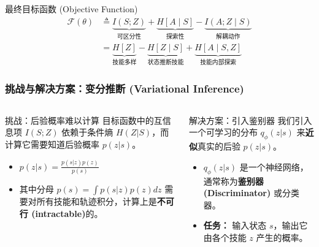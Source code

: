 \documentclass{beamer}
\begin{document}
\begin{frame}
    \begin{alertblock}{最终目标函数 (Objective Function)}
    \begin{align*}
        \mathcal{F}(\theta) 
        &\triangleq \underbrace{I(S; Z)}_{\text{可区分性}} 
                 + \underbrace{H[A \mid S]}_{\text{探索性}} 
                 - \underbrace{I(A; Z \mid S)}_{\text{解耦动作}} \\
        &= \underbrace{H[Z]}_{\text{技能多样}} 
           - \underbrace{H[Z \mid S]}_{\text{状态推断技能}} 
           + \underbrace{H[A \mid S, Z]}_{\text{技能内部探索}}
    \end{align*}
    \end{alertblock}

\end{frame}

\begin{frame}
    
    \frametitle{挑战与解决方案：变分推断 (Variational Inference)}
    \tiny
    \vspace{-0.2cm}
    \begin{columns}[T]
        \begin{column}{0.5\textwidth}
            \begin{alertblock}{挑战：后验概率难以计算}
                目标函数中的互信息项 $I(S;Z)$ 依赖于条件熵 $H(Z|S)$，而计算它需要知道后验概率 $p(z|s)$。
                \vspace{0.3em}
                \begin{itemize}
                    \item $p(z|s) = \frac{p(s|z)p(z)}{p(s)}$
                    \item 其中分母 $p(s) = \int p(s|z)p(z)dz$ 需要对所有技能和轨迹积分，计算上是\textbf{不可行 (intractable)}的。
                \end{itemize}
            \end{alertblock}
        \end{column}

        \begin{column}{0.5\textwidth}
            \begin{block}{解决方案：引入鉴别器}
                我们引入一个可学习的分布 $q_\phi(z|s)$ 来\textbf{近似}真实的后验 $p(z|s)$。
                \vspace{0.3em}
                \begin{itemize}
                    \item $q_\phi(z|s)$ 是一个神经网络，通常称为\textbf{鉴别器 (Discriminator)} 或分类器。
                    \item \textbf{任务：} 输入状态 $s$，输出它由各个技能 $z$ 产生的概率。
                \end{itemize}
            \end{block}
        \end{column}
    \end{columns}


\end{frame}
\end{document}

